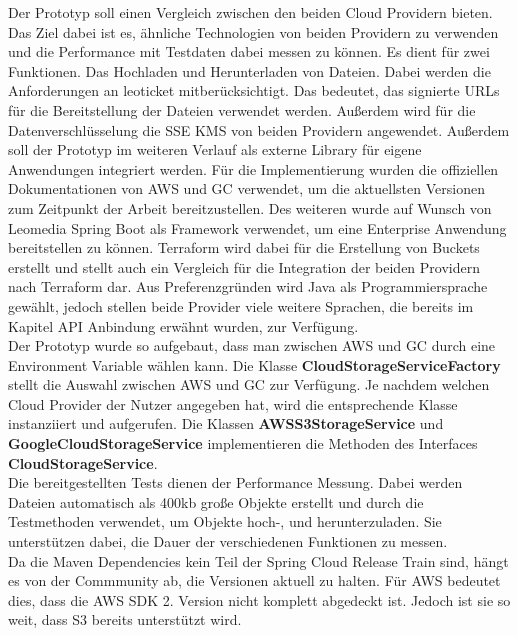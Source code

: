 Der Prototyp soll einen Vergleich zwischen den beiden Cloud Providern bieten. Das Ziel dabei ist es, ähnliche Technologien von beiden Providern zu verwenden und die Performance mit Testdaten dabei messen zu können. Es dient für zwei Funktionen. Das Hochladen und Herunterladen von Dateien. Dabei werden die Anforderungen an leoticket mitberücksichtigt. Das bedeutet, das signierte URLs für die Bereitstellung der Dateien verwendet werden. Außerdem wird für die Datenverschlüsselung die SSE KMS von beiden Providern angewendet. Außerdem soll der Prototyp im weiteren Verlauf als externe Library für eigene Anwendungen integriert werden. Für die Implementierung wurden die offiziellen Dokumentationen von AWS und GC verwendet, um die aktuellsten Versionen zum Zeitpunkt der Arbeit bereitzustellen. Des weiteren wurde auf Wunsch von Leomedia Spring Boot als Framework verwendet, um eine Enterprise Anwendung bereitstellen zu können. Terraform wird dabei für die Erstellung von Buckets erstellt und stellt auch ein Vergleich für die Integration der beiden Providern nach Terraform dar. Aus Preferenzgründen wird Java als Programmiersprache gewählt, jedoch stellen beide Provider viele weitere Sprachen, die bereits im Kapitel API Anbindung erwähnt wurden, zur Verfügung.\\

Der Prototyp wurde so aufgebaut, dass man zwischen AWS und GC durch eine Environment Variable wählen kann. Die Klasse \textbf{CloudStorageServiceFactory} stellt die Auswahl zwischen AWS und GC zur Verfügung. Je nachdem welchen Cloud Provider der Nutzer angegeben hat, wird die entsprechende Klasse instanziiert und aufgerufen. Die Klassen \textbf{AWSS3StorageService} und \textbf{GoogleCloudStorageService} implementieren die Methoden des Interfaces \textbf{CloudStorageService}.\\

Die bereitgestellten Tests dienen der Performance Messung. Dabei werden Dateien automatisch als 400kb große Objekte erstellt und durch die Testmethoden verwendet, um Objekte hoch-, und herunterzuladen. Sie unterstützen dabei, die Dauer der verschiedenen Funktionen zu messen.\\

Da die Maven Dependencies kein Teil der Spring Cloud Release Train sind, hängt es von der Commmunity ab, die Versionen aktuell zu halten. Für AWS bedeutet dies, dass die AWS SDK 2. Version nicht komplett abgedeckt ist. Jedoch ist sie so weit, dass S3 bereits unterstützt wird. 

